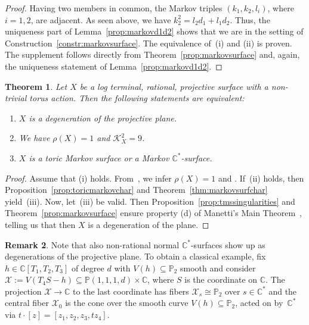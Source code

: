 \documentclass[10pt,a4paper]{amsart}
\newtheorem{thm}{Theorem}[section]
\theoremstyle{definition}
\newtheorem{rem}[thm]{Remark}
\def\CC{{\mathbb C}}
\def\PP{{\mathbb P}}
\begin{document}
\begin{proof}
Having two members in common, the
Markov triples $(k_1,k_2,l_i)$,
where $i=1,2$, are adjacent.
As seen above, we have $k_2^2 = l_2d_1 + l_1d_2$.
Thus, the uniqueness part of
Lemma~\ref{prop:markovd1d2} shows
that we are in the setting of
Construction~\ref{constr:markovsurface}.
The equivalence of~(i) and (ii) is proven.
The supplement follows directly from
Theorem~\ref{prop:markovsurface}
and, again, the uniqueness statement of
Lemma~\ref{prop:markovd1d2}.
\end{proof}


\begin{thm}
\label{cor:planedegs}
Let $X$ be a log terminal,
rational, projective surface with a non-trivial
torus action.
Then the following statements are equivalent:
\begin{enumerate}\itemsep=0pt
\item[$(i)$]
$X$ is a degeneration of the projective
plane.
\item[$(ii)$]
We have $\rho(X) = 1$ and $\mathcal{K}_X^2 = 9$.
\item[$(iii)$]
$X$ is a toric Markov surface or a
Markov $\CC^*$-surface.
\end{enumerate}
\end{thm}


\begin{proof}
Assume that (i) holds.
From~\cite[Theorem~4, Corollary~5]{Ma}, we infer
$\rho(X)=1$ and .
If~(ii) holds, then Proposition~\ref{prop:toricmarkovchar}
and Theorem~\ref{thm:markovsurfchar}
yield~(iii).
Now, let~(iii) be valid.
Then Proposition~\ref{prop:tmssingularities}
and
Theorem~\ref{prop:markovsurface}
ensure property (d) of Manetti's
Main Theorem~\mbox{\cite[p.~90]{Ma}},
telling us that then $X$ is
a degeneration of the plane.
\end{proof}


\begin{rem}
Note that also non-rational normal $\CC^*$-surfaces
show up as degenerations of the projective plane.
To obtain a classical example, fix $h \in \CC[T_1,T_2,T_3]$
of degree $d$ with $V(h) \subseteq \PP_2$ smooth and
consider
$
\mathcal{X}
 :=
V(T_4S - h)
 \subseteq
\PP(1,1,1,d) \times \CC$,
where $S$ is the coordinate on $\CC$. The projection
$\mathcal{X} \to \CC$ to the last coordinate has fibers
$\mathcal{X}_s \cong \PP_2$ over $s \in \CC^*$ and
the central fiber $\mathcal{X}_0$ is the cone over
the smooth curve $V(h) \subseteq \PP_2$, acted on by~$\CC^*$
via $t \cdot [z] = [z_1,z_2,z_3,tz_4]$.
\end{rem}
\end{document}
